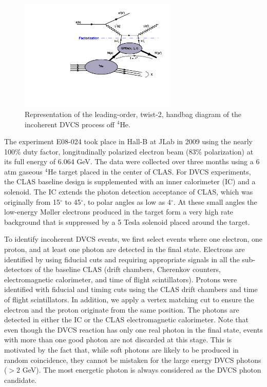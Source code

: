 \documentclass[twocolumn,nofootinbib,showpacs,prl,superscriptaddress,secnumarabic,amssymb,nobibnotes,aps,floatfix]{revtex4}
\begin{document}
\begin{figure}[tb]
\includegraphics[width=7.5cm]{figs/handbag_incoherent.pdf}
\caption{Representation of the leading-order, twist-2, handbag diagram of the 
incoherent DVCS process off $^4$He.}
\label{fig:diags}
\end{figure}


The experiment E08-024 took place in Hall-B at JLab
in 2009 using the nearly 100\% duty factor, longitudinally 
polarized electron beam (83$\%$ polarization) at its full energy of 6.064 
GeV. The data were collected over three months using a 6 atm gaseous $^4$He 
target placed in the center of CLAS. For DVCS experiments, the CLAS baseline 
design \cite{Mecking:2003zu} is supplemented with an inner calorimeter (IC) and 
a solenoid. The IC extends the photon detection acceptance of CLAS, which was 
originally from 15$^{\circ}$ to 45$^{\circ}$, to polar angles as low as 
4$^{\circ}$. At these small angles the low-energy M\o{}ller electrons produced 
in the target form a very high rate background that is
suppressed by a 5 Tesla solenoid placed around the target. 

To identify incoherent DVCS events, we first select events where one electron, 
one proton, and at least one photon are detected in the final state. Electrons 
are identified by using fiducial cuts and requiring appropriate signals in all 
the sub-detectors of the baseline CLAS (drift chambers, Cherenkov counters, 
electromagnetic calorimeter, and time of flight scintillators). Protons were 
identified with fiducial and timing cuts using the CLAS drift chambers and time 
of flight scintillators. In addition, we apply a vertex matching cut to ensure 
the electron and the proton originate from the same position. The photons are 
detected in either the IC or the CLAS electromagnetic calorimeter.  Note that 
even though the DVCS reaction has only one real photon in the final state, 
events with more than one good photon are not discarded at this stage. This is 
motivated by the fact that, while soft photons are likely to be produced in 
random coincidence, they cannot be mistaken for the large energy DVCS photons 
($>2$ GeV). The most energetic photon is always considered as the DVCS photon 
candidate.
\end{document}

